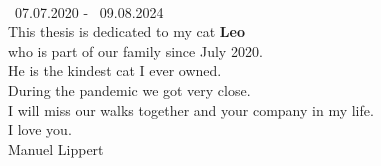 \NewPage
\thispagestyle{empty}

\begin{center}
    \vspace*{3cm}
    \vspace{2cm}\\
    \gtrsymBorn~07.07.2020 - \gtrsymDied~09.08.2024 \\
    \bigskip
    This thesis is dedicated to my cat \textbf{Leo}\\ who is part of our family since July 2020.\\ He is the kindest cat I ever owned.\\ During the pandemic we got very close. \\ I will miss our walks together and your company in my life. \\ 
    \bigskip
    I love you.\\
    \bigskip
    Manuel Lippert\\
\end{center}